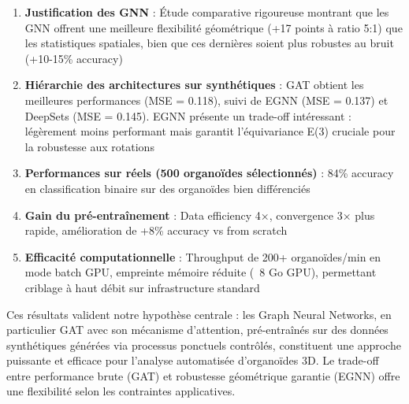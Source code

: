 \begin{enumerate}
    \item \textbf{Justification des GNN} : Étude comparative rigoureuse montrant que les GNN offrent une meilleure flexibilité géométrique (+17 points à ratio 5:1) que les statistiques spatiales, bien que ces dernières soient plus robustes au bruit (+10-15\% accuracy)
    
    \item \textbf{Hiérarchie des architectures sur synthétiques} : GAT obtient les meilleures performances (MSE = 0.118), suivi de EGNN (MSE = 0.137) et DeepSets (MSE = 0.145). EGNN présente un trade-off intéressant : légèrement moins performant mais garantit l'équivariance E(3) cruciale pour la robustesse aux rotations

    \item \textbf{Performances sur réels (500 organoïdes sélectionnés)} : 84\% accuracy en classification binaire sur des organoïdes bien différenciés
    
    \item \textbf{Gain du pré-entraînement} : Data efficiency 4×, convergence 3× plus rapide, amélioration de +8\% accuracy vs from scratch
    
    \item \textbf{Efficacité computationnelle} : Throughput de 200+ organoïdes/min en mode batch GPU, empreinte mémoire réduite (~8 Go GPU), permettant criblage à haut débit sur infrastructure standard
\end{enumerate}

Ces résultats valident notre hypothèse centrale : les Graph Neural Networks, en particulier GAT avec son mécanisme d'attention, pré-entraînés sur des données synthétiques générées via processus ponctuels contrôlés, constituent une approche puissante et efficace pour l'analyse automatisée d'organoïdes 3D. Le trade-off entre performance brute (GAT) et robustesse géométrique garantie (EGNN) offre une flexibilité selon les contraintes applicatives.
